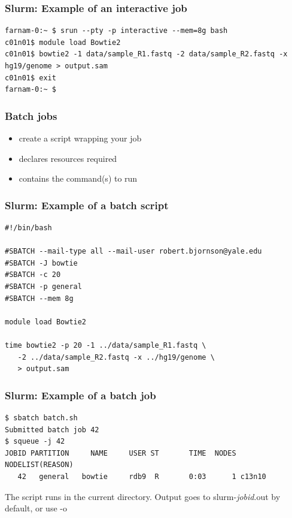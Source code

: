 \documentclass[10pt]{beamer}
\newcommand\smallfont{\fontsize{8pt}{7.2}\selectfont}
\newcommand\regfont{\fontsize{10pt}{7.2}\selectfont}
\begin{document}
\begin{frame}[fragile]
\frametitle{Slurm: Example of an interactive job}
\begin{verbatim}
farnam-0:~ $ srun --pty -p interactive --mem=8g bash
c01n01$ module load Bowtie2
c01n01$ bowtie2 -1 data/sample_R1.fastq -2 data/sample_R2.fastq -x hg19/genome > output.sam
c01n01$ exit
farnam-0:~ $
\end{verbatim}
\end{frame}

\begin{frame}[fragile]
\frametitle{Batch jobs}
\begin{itemize}
\item create a script wrapping your job
\item declares resources required
\item contains the command(s) to run
\end{itemize}

\end{frame}

\begin{frame}[fragile]
\frametitle{Slurm: Example of a batch script}

\begin{block}{}
\begin{verbatim}
#!/bin/bash

#SBATCH --mail-type all --mail-user robert.bjornson@yale.edu
#SBATCH -J bowtie
#SBATCH -c 20 
#SBATCH -p general
#SBATCH --mem 8g 

module load Bowtie2

time bowtie2 -p 20 -1 ../data/sample_R1.fastq \
   -2 ../data/sample_R2.fastq -x ../hg19/genome \
   > output.sam

\end{verbatim}
\end{block}{}
\end{frame}

\begin{frame}[fragile]
\frametitle{Slurm: Example of a batch job}
\smallfont
\begin{verbatim}
$ sbatch batch.sh
Submitted batch job 42
$ squeue -j 42
JOBID PARTITION     NAME     USER ST       TIME  NODES NODELIST(REASON)
   42   general   bowtie     rdb9  R       0:03      1 c13n10
\end{verbatim}
\vskip14pt
\regfont
The script runs in the current directory.  
Output goes to slurm-\textit{jobid}.out by default, or use -o
\end{frame}
\end{document}
